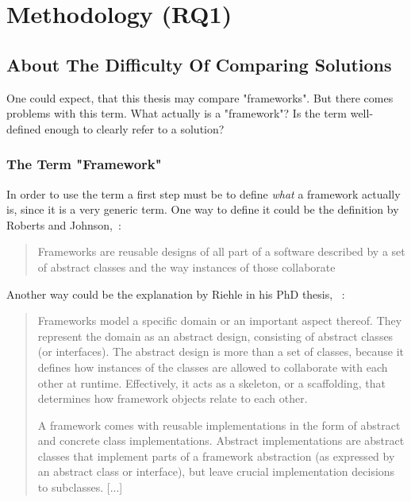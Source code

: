 \chapter{Methodology (RQ1)}\label{chap:methodology}
\section{About The Difficulty Of Comparing Solutions}\label{def:framework}

One could expect, that this thesis may compare "frameworks". But there comes 
problems with this term. What actually is a "framework"? Is the term well-defined 
enough to clearly refer to a solution?

\subsection{The Term "Framework"}

In order to use the term a first step must be to define \emph{what} a framework 
actually is, since it is a very generic term. One way to define it could be the 
definition by Roberts and Johnson,~\cite{roberts1996evolving}:

\begin{quotation}
Frameworks are reusable designs of all part of a software described by a set of 
abstract classes and the way instances of those collaborate
\end{quotation}

Another way could be the explanation by Riehle in his PhD thesis,~
\cite{riehle2000framework}:

\begin{quotation}
Frameworks model a specific domain or an important aspect thereof. They represent 
the domain as an abstract design, consisting of abstract classes (or interfaces). 
The abstract design is more than a set of classes, because it defines how 
instances of the classes are allowed to collaborate with each other at runtime. 
Effectively, it acts as a skeleton, or a scaffolding, that determines how 
framework objects relate to each other.

A framework comes with reusable implementations in the form of abstract and 
concrete class implementations. Abstract implementations are abstract classes that 
implement parts of a framework abstraction (as expressed by an abstract class or 
interface), but leave crucial implementation decisions to subclasses. [...]
\end{quotation}

